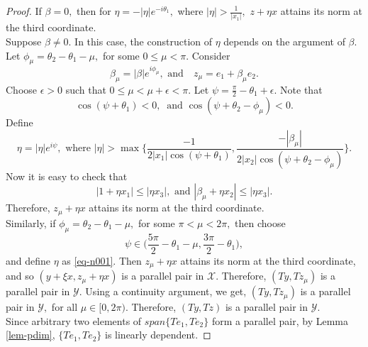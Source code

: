 \documentclass{amsart}
\theoremstyle{definition}
\theoremstyle{remark}
\numberwithin{equation}{section}
\begin{document}
\begin{proof}
If $\beta=0,$ then for $\eta=-|\eta|e^{-i\theta_1},$ where $|\eta|>\frac{1}{|x_1|},$ %
$z+\eta x$  attains its norm at the third coordinate.\\ %

Suppose $\beta\neq 0.$ In this case, the construction of $\eta$ depends on the argument of $\beta.$ Let $\phi_\mu=\theta_2-\theta_1-\mu,$ for some $0\leq \mu<\pi.$ Consider 
$$ \beta_\mu=|\beta|e^{i\phi_\mu},\text{ and}\quad z_\mu=e_1+\beta_\mu e_2.$$
Choose $\epsilon>0$ such that $0\leq \mu<\mu+\epsilon<\pi.$ Let $\psi=\frac{\pi}{2}-\theta_1+\epsilon.$ Note that \[\cos(\psi+\theta_1)<0, ~\text{ and } \cos(\psi+\theta_2-\phi_\mu)<0.\] 
Define 
\begin{equation}\label{eq-n001}
	 \eta =|\eta|e^{i\psi}, \text{ where } |\eta|>\max\Big\{\frac{-1}{2|x_1|\cos(\psi+\theta_1)}, \frac{-|\beta_\mu|}{2|x_2|\cos(\psi+\theta_2-\phi_\mu)}\Big\}.
	 \end{equation}
Now it is easy to check that 
\[|1+\eta x_1|\leq |\eta x_3|,\text{ and } |\beta_\mu+\eta x_2|\leq |\eta x_3|.\]
Therefore, $z_\mu+\eta x$ attains its norm at the third coordinate. \\
 Similarly, if $\phi_\mu=\theta_2-\theta_1-\mu,$ for some $\pi< \mu<2\pi,$ then 
 choose $$\psi\in \Big(\frac{5\pi}{2}-\theta_1-\mu,\frac{3\pi}{2}-\theta_1\Big),$$ and define $\eta$ as \eqref{eq-n001}. Then  $z_\mu+\eta x$ attains its norm at the third coordinate, and so $(y+\xi x, z_\mu+\eta x)$ is a parallel pair in $\mathcal{X}.$ Therefore, $(Ty,Tz_\mu)$ is a parallel pair in $\mathcal{Y}.$ Using a continuity argument, we get,  $(Ty,Tz_\mu)$ is a parallel pair in $\mathcal{Y},$ for all $\mu\in [0,2\pi).$ Therefore, $(Ty,Tz)$ is a parallel pair in $\mathcal{Y}.$\\
 Since arbitrary two elements of $span\{Te_1,Te_2\}$ form a parallel pair, by Lemma \ref{lem-pdim}, $\{Te_1,Te_2\}$ is linearly dependent.
\end{proof}
\end{document}
